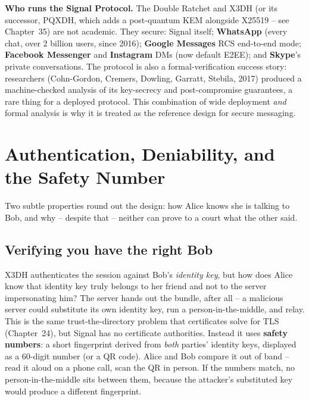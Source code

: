 \begin{applicationbox}
\textbf{Who runs the Signal Protocol.} The Double Ratchet and X3DH (or its successor, PQXDH, which adds a post-quantum KEM alongside X25519 -- see Chapter~35) are not academic. They secure: Signal itself; \textbf{WhatsApp} (every chat, over 2 billion users, since 2016); \textbf{Google Messages} RCS end-to-end mode; \textbf{Facebook Messenger} and \textbf{Instagram} DMs (now default E2EE); and \textbf{Skype}'s private conversations. The protocol is also a formal-verification success story: researchers (Cohn-Gordon, Cremers, Dowling, Garratt, Stebila, 2017) produced a machine-checked analysis of its key-secrecy and post-compromise guarantees, a rare thing for a deployed protocol. This combination of wide deployment \emph{and} formal analysis is why it is treated as the reference design for secure messaging.
\end{applicationbox}

\section{Authentication, Deniability, and the Safety Number}
\label{ch27:deniability}

Two subtle properties round out the design: how Alice knows she is talking to Bob, and why -- despite that -- neither can prove to a court what the other said.

\subsection{Verifying you have the right Bob}
\label{ch27:safety-number}

X3DH authenticates the session against Bob's \emph{identity key}, but how does Alice know that identity key truly belongs to her friend and not to the server impersonating him? The server hands out the bundle, after all -- a malicious server could substitute its own identity key, run a person-in-the-middle, and relay. This is the same trust-the-directory problem that certificates solve for TLS (Chapter~24), but Signal has no certificate authorities. Instead it uses \textbf{safety numbers}: a short fingerprint derived from \emph{both} parties' identity keys, displayed as a 60-digit number (or a QR code). Alice and Bob compare it out of band -- read it aloud on a phone call, scan the QR in person. If the numbers match, no person-in-the-middle sits between them, because the attacker's substituted key would produce a different fingerprint.

